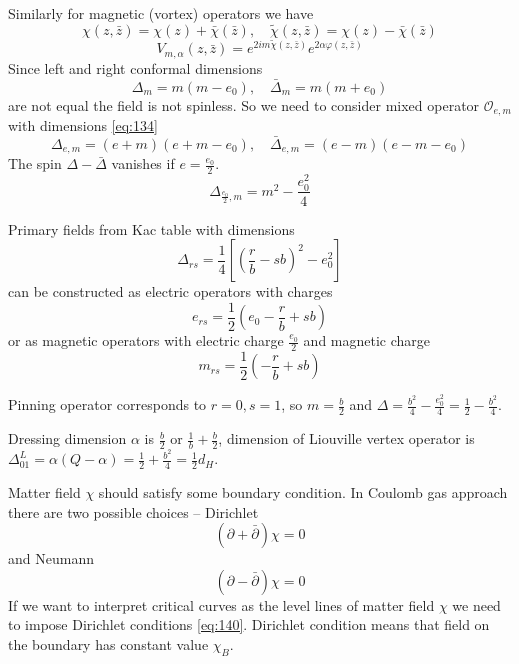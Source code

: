 \documentclass[12pt]{article}
\begin{document}
Similarly for magnetic (vortex) operators we have
\begin{equation}
  \label{eq:169}
  \chi(z,\bar z)=\chi(z)+\bar\chi(\bar z),\quad \tilde\chi(z,\bar z)=\chi(z)-\bar\chi(\bar z)
\end{equation}
\begin{equation}
  \label{eq:170}
  V_{m,\alpha}(z,\bar z)=e^{2im\tilde\chi(z,\bar z)} e^{2\alpha\varphi(z,\bar z)}
\end{equation}
Since left and right conformal dimensions
\begin{equation}
  \label{eq:171}
  \Delta_{m}=m(m-e_{0}), \quad \bar\Delta_{m}=m(m+e_{0})
\end{equation}
are not equal the field is not spinless. So we need to consider mixed operator $\mathcal{O}_{e,m}$
with dimensions \eqref{eq:134}
\begin{equation}
  \label{eq:172}
  \Delta_{e,m}=(e+m)(e+m-e_{0}), \quad \bar \Delta_{e,m}=(e-m)(e-m-e_{0})
\end{equation}
The spin $\Delta-\bar\Delta$ vanishes if $e=\frac{e_{0}}{2}$.
\begin{equation}
  \label{eq:173}
  \Delta_{\frac{e_{0}}{2},m}=m^{2}-\frac{e_{0}^{2}}{4}
\end{equation}

Primary fields from Kac table with dimensions
\begin{equation}
  \label{eq:174}
  \Delta_{rs}=\frac{1}{4}\left[\left(\frac{r}{b}-sb\right)^{2}-e_{0}^{2}\right]
\end{equation}
can be constructed as electric operators with charges
\begin{equation}
  \label{eq:175}
  e_{rs}=\frac{1}{2}\left(e_{0}-\frac{r}{b}+sb\right)
\end{equation}
or as magnetic operators with electric charge $\frac{e_{0}}{2}$ and magnetic charge
\begin{equation}
  \label{eq:176}
  m_{rs}=\frac{1}{2}\left(-\frac{r}{b}+sb\right)
\end{equation}

Pinning operator corresponds to $r=0, s=1$, so $m=\frac{b}{2}$ and
$\Delta=\frac{b^{2}}{4}-\frac{e_{0}^{2}}{4}=\frac{1}{2}-\frac{b^{2}}{4}$.

Dressing dimension $\alpha$ is $\frac{b}{2}$ or $\frac{1}{b}+\frac{b}{2}$, dimension of Liouville
vertex operator is $\Delta_{01}^{L}=\alpha(Q-\alpha)=\frac{1}{2}+\frac{b^{2}}{4}=\frac{1}{2}d_{H}$.

Matter field $\chi$ should satisfy some boundary condition. In Coulomb gas approach there are two
possible choices -- Dirichlet 
\begin{equation}
  \label{eq:177}
  (\partial+\bar \partial)\chi=0
\end{equation}
and Neumann
\begin{equation}
  \label{eq:178}
  (\partial-\bar \partial)\chi=0  
\end{equation}
If we want to interpret critical curves as the level lines of matter field $\chi$ we need to impose
Dirichlet conditions \eqref{eq:140}. Dirichlet condition means that field on the boundary has
constant value $\chi_{B}$. 
\end{document}
